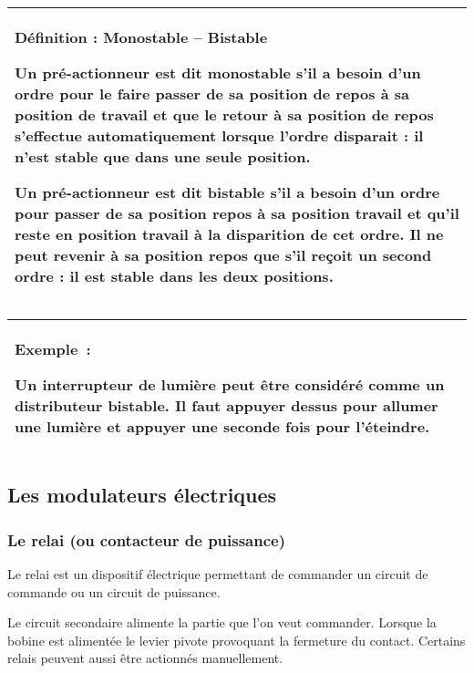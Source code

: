 \documentclass[
]{article}
\begin{document}
\begin{longtable}[]{@{}
  >{\raggedright\arraybackslash}p{}@{}}
\toprule
\endhead
\textbf{Définition : Monostable -- Bistable}

Un pré-actionneur est dit monostable s'il a besoin d'un ordre pour le
faire passer de sa position de repos à sa position de travail et que le
retour à sa position de repos s'effectue automatiquement lorsque l'ordre
disparait : \textbf{il n'est stable que dans une seule position}.

Un pré-actionneur est dit bistable s'il a besoin d'un ordre pour passer
de sa position repos à sa position travail et qu'il reste en position
travail à la disparition de cet ordre. Il ne peut revenir à sa position
repos que s'il reçoit un second ordre : \textbf{il est stable dans les
deux positions}. \\
\bottomrule
\end{longtable}

\begin{longtable}[]{@{}
  >{\raggedright\arraybackslash}p{}@{}}
\toprule
\endhead
\textbf{Exemple~:}

Un interrupteur de lumière peut être considéré comme un distributeur
bistable. Il faut appuyer dessus pour allumer une lumière et appuyer une
seconde fois pour l'éteindre. \\
\bottomrule
\end{longtable}

\hypertarget{les-modulateurs-uxe9lectriques}{%
\subsection{Les modulateurs
électriques}\label{les-modulateurs-uxe9lectriques}}

\hypertarget{le-relai-ou-contacteur-de-puissance}{%
\subsubsection{Le relai (ou contacteur de
puissance)}\label{le-relai-ou-contacteur-de-puissance}}

Le relai est un dispositif électrique permettant de commander un circuit
de commande ou un circuit de puissance.

Le circuit secondaire alimente la partie que l'on veut commander.
Lorsque la bobine est alimentée le levier pivote provoquant la fermeture
du contact. Certains relais peuvent aussi être actionnés manuellement.
\end{document}
